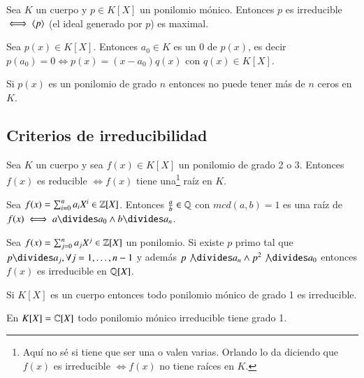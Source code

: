 \begin{pro}
	\label{pro:irreducibleiffmaximal}
	Sea $K$ un cuerpo y $p \in K[X]$ un ponilomio mónico. Entonces $p$ es irreducible $\iff \langle p\rangle$ (el ideal generado por $p$) es maximal.
\end{pro}


\begin{pro}
	Sea $p(x) \in K[X]$. Entonces $a_0 \in K$ es un $0$ de $p(x)$, es decir $p(a_0) = 0 \iff p(x) = (x-a_0)q(x)$ con $q(x) \in K[X]$.
\end{pro}

\begin{obs}
	Si $p(x)$ es un ponilomio de grado $n$ entonces no puede tener más de $n$ ceros en $K$.
\end{obs}

\subsection{Criterios de irreducibilidad}

\begin{thm}\cite[p.222]{dor96}
	Sea $K$ un cuerpo y sea $f(x) \in K[X]$ un ponilomio de grado 2 o 3. Entonces $f(x)$ es reducible $\iff f(x)$ tiene una\footnote{Aquí no sé si tiene que ser una o valen varias. Orlando lo da diciendo que $f(x)$ es irreducible $\iff f(x)$ no tiene raíces en $K$.} raíz en $K$.
\end{thm}

\begin{pro}
	
		Sea $f(x) = \sum_{i=0}^{n}a_iX^i \in \mathbb{Z}[X]$. Entonces $\frac{a}{b} \in \mathbb{Q}$ con $mcd(a,b) = 1$ es una raíz de $f(x) \iff a \divides a_0 \land b \divides a_n$.
\end{pro}

\begin{thm}
	Sea $f(x) = \sum_{j=0}^{n}a_jX^j \in \mathbb{Z}[X]$ un ponilomio. Si existe $p$ primo tal que $p \divides a_j, \forall j = 1, \dots, n-1$ y además $p \not\divides a_n \land p^2 \not\divides a_0$ entonces $f(x)$ es irreducible en $\mathbb{Q}[X]$.
\end{thm}

\begin{pro}
	Si $K[X]$ es un cuerpo entonces todo ponilomio mónico de grado 1 es irreducible.
\end{pro}

\begin{obs}
	En $K[X] = \mathbb{C}[X]$ todo ponilomio mónico irreducible tiene grado 1.
\end{obs}

